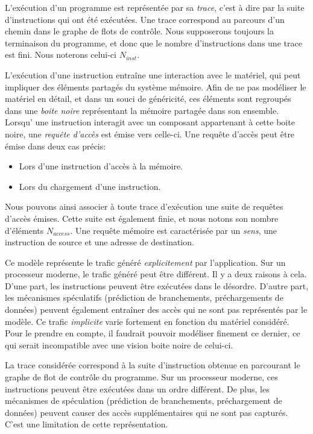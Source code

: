 L'exécution d'un programme est représentée par sa \emph{trace}, c'est à dire par la suite d'instructions qui ont été exécutées.
Une trace correspond au parcours d'un chemin dans le graphe de flots de contrôle.
Nous supposerons toujours la terminaison du programme, et donc que le nombre d'instructions dans une trace est fini.
Nous noterons celui-ci $N_{inst}$.

L'exécution d'une instruction entraîne une interaction avec le matériel, qui peut impliquer des éléments partagés du système mémoire.
Afin de ne pas modéliser le matériel en détail, et dans un souci de généricité, ces éléments sont regroupés dans une \emph{boite noire} représentant la mémoire partagée dans son ensemble.
Lorsqu’ une instruction interagit avec un composant appartenant à cette boite noire, une \emph{requête d'accès} est émise vers celle-ci.
Une requête d'accès peut être émise dans deux cas précis:
\begin{itemize}
	\item Lors d'une instruction d'accès à la mémoire.
	\item Lors du chargement d'une instruction.
\end{itemize}
Nous pouvons ainsi associer à toute trace d'exécution une suite de requêtes d'accès émises.
Cette suite est également finie, et nous notons son nombre d'éléments $N_{access}$.
Une requête mémoire est caractérisée par un \emph{sens}, une instruction de source et une adresse de destination.

Ce modèle représente le trafic généré \emph{explicitement} par l'application.
Sur un processeur moderne, le trafic généré peut être différent.
Il y a deux raisons à cela.
D'une part, les instructions peuvent être exécutées dans le désordre.
D'autre part, les mécanismes spéculatifs (prédiction de branchements, préchargements de données) peuvent également entraîner des accès qui ne sont pas représentés par le modèle.
Ce trafic \emph{implicite} varie fortement en fonction du matériel considéré.
Pour le prendre en compte, il faudrait pouvoir modéliser finement ce dernier, ce qui serait incompatible avec une vision boite noire de celui-ci.

La trace considérée correspond à la suite d'instruction obtenue en parcourant le graphe de flot de contrôle du programme.
Sur un processeur moderne, ces instructions peuvent être exécutées dans un ordre différent.
De plus, les mécanismes de spéculation (prédiction de branchements, préchargement de données) peuvent causer des accès supplémentaires qui ne sont pas capturés.
C'est une limitation de cette représentation.

